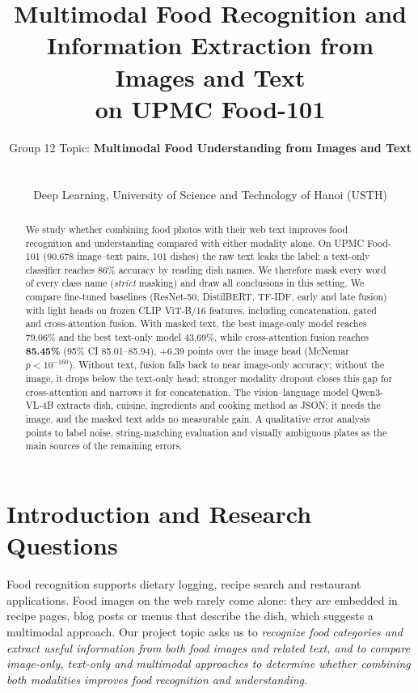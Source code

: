 \documentclass[11pt,a4paper]{article}
\title{\textbf{Multimodal Food Recognition and\\Information Extraction from Images and Text\\on UPMC Food-101}}
\author{
  Group 12 \quad Topic: \textbf{Multimodal Food Understanding from Images and Text}\\[6pt]
  \vn{Bùi Việt Hoàng} \quad \vn{Vũ Quang Huy} \quad \vn{Nghiêm Trọng Quốc Anh}\\[2pt]
  \vn{Nguyễn Bá Khoa} \quad \vn{Ngô Hải Huyền} \quad \vn{Nguyễn Khắc Hưng}\\[6pt]
  \small Deep Learning, University of Science and Technology of Hanoi (USTH)
}
\date{}
\newcommand{\best}[1]{\textbf{#1}}
\begin{document}
\maketitle

\begin{abstract}
We study whether combining food photos with their web text improves food recognition and understanding
compared with either modality alone. On UPMC Food-101 (90,678 image--text pairs, 101 dishes) the raw text leaks
the label: a text-only classifier reaches 86\% accuracy by reading dish names. We therefore mask every word of
every class name (\emph{strict} masking) and draw all conclusions in this setting. We compare fine-tuned
baselines (ResNet-50, DistilBERT, TF-IDF, early and late fusion) with light heads on frozen CLIP ViT-B/16
features, including concatenation, gated and cross-attention fusion. With masked text, the best image-only
model reaches 79.06\% and the best text-only model 43.69\%, while cross-attention fusion reaches \best{85.45\%}
(95\% CI 85.01--85.94), $+6.39$ points over the image head (McNemar $p<10^{-160}$). Without text, fusion falls
back to near image-only accuracy; without the image, it drops below the text-only head; stronger modality dropout closes this gap for
cross-attention and narrows it for concatenation. The vision--language model Qwen3-VL-4B extracts dish, cuisine,
ingredients and cooking method as JSON; it needs the image, and the masked text adds no measurable gain. A qualitative error analysis points to label noise,
string-matching evaluation and visually ambiguous plates as the main sources of the remaining errors.
\end{abstract}

\section{Introduction and Research Questions}

Food recognition supports dietary logging, recipe search and restaurant applications. Food images on the
web rarely come alone: they are embedded in recipe pages, blog posts or menus that describe the dish, which
suggests a multimodal approach. Our project topic asks us to \emph{recognize food categories and extract useful
information from both food images and related text, and to compare image-only, text-only and multimodal
approaches to determine whether combining both modalities improves food recognition and understanding}.
\end{document}
